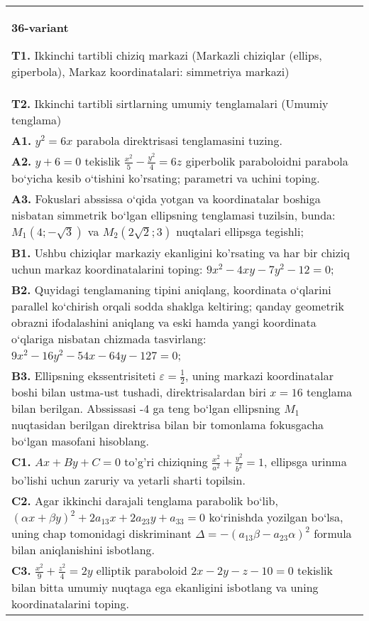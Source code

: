 \documentclass{article}
\begin{document}
\begin{tabular}{m{17cm}}
\textbf{36-variant}
\newline

\textbf{T1.} Ikkinchi tartibli chiziq markazi (Markazli chiziqlar (ellips, giperbola), Markaz koordinatalari: simmetriya markazi) \\
\textbf{T2.} Ikkinchi tartibli sirtlarning umumiy tenglamalari (Umumiy tenglama) \\
\textbf{A1.} $y^2=6 x$ parabola direktrisasi tenglamasini tuzing. \\
\textbf{A2.} $y+6=0$ tekislik $\frac{x^2}{5}-\frac{y^2}{4}=6 z$ giperbolik paraboloidni parabola bo‘yicha kesib o‘tishini ko'rsating; parametri va uchini toping. \\
\textbf{A3.} Fokuslari abssissa o‘qida yotgan va koordinatalar boshiga nisbatan simmetrik bo‘lgan ellipsning tenglamasi tuzilsin, bunda: $M_1(4 ;-\sqrt{3})$ va $M_2(2 \sqrt{2} ; 3)$ nuqtalari ellipsga tegishli; \\
\textbf{B1.} Ushbu chiziqlar markaziy ekanligini ko'rsating va har bir chiziq uchun markaz koordinatalarini toping: $9 x^2-4 x y-7 y^2-12=0$; \\
\textbf{B2.} Quyidagi tenglamaning tipini aniqlang, koordinata o‘qlarini parallel ko‘chirish orqali sodda shaklga keltiring; qanday geometrik obrazni ifodalashini aniqlang va eski hamda yangi koordinata o‘qlariga nisbatan chizmada tasvirlang: $9 x^2-16 y^2-54 x-64 y-127=0$; \\
\textbf{B3.} Ellipsning ekssentrisiteti $\varepsilon=\frac{1}{2}$, uning markazi koordinatalar boshi bilan ustma-ust tushadi, direktrisalardan biri $x=16$ tenglama bilan berilgan. Abssissasi -4 ga teng bo‘lgan ellipsning $M_1$ nuqtasidan berilgan direktrisa bilan bir tomonlama fokusgacha bo‘lgan masofani hisoblang. \\
\textbf{C1.} $A x+B y+C=0$ to'g'ri chiziqning $\frac{x^2}{a^2}+\frac{y^2}{b^2}=1$, ellipsga urinma bo'lishi uchun zaruriy va yetarli sharti topilsin. \\
\textbf{C2.} Agar ikkinchi darajali tenglama parabolik bo‘lib, $ (\alpha x+\beta y) ^2+2a_{13}x+2a_{23}y+a_{33}=0$ ko‘rinishda yozilgan bo‘lsa, uning chap tomonidagi diskriminant $\Delta=- (a_{13} \beta-a_{23} \alpha) ^2$ formula bilan aniqlanishini isbotlang. \\
\textbf{C3.} $\frac{x^2}{9}+\frac{z^2}{4}=2 y$ elliptik paraboloid $2 x-2 y-z-10=0$ tekislik bilan bitta umumiy nuqtaga ega ekanligini isbotlang va uning koordinatalarini toping. \\

\end{tabular}
\vspace{1cm}
\end{document}
